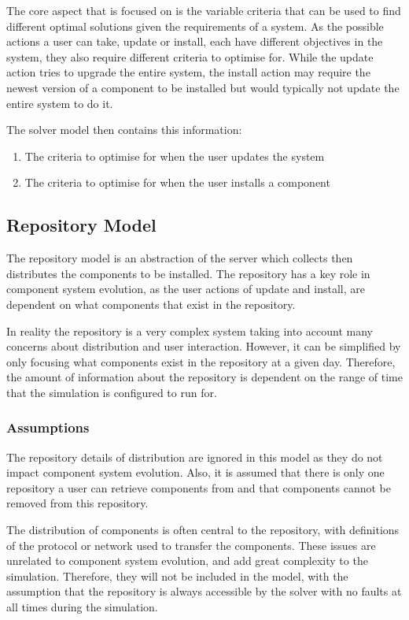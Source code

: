 The core aspect that is focused on is the variable criteria that can be used to find different optimal solutions given the requirements of a system.
As the possible actions a user can take, update or install, each have different objectives in the system,
they also require different criteria to optimise for.
While the update action tries to upgrade the entire system, 
the install action may require the newest version of a component to be installed but would typically not update the entire system to do it. 

The solver model then contains this information:
\begin{enumerate}
  \item The criteria to optimise for when the user updates the system
  \item The criteria to optimise for when the user installs a component
\end{enumerate}

\subsection{Repository Model}
The repository model is an abstraction of the server which collects then distributes the components to be installed.
The repository has a key role in component system evolution, 
as the user actions of update and install, are dependent on what components that exist in the repository.

In reality the repository is a very complex system taking into account many concerns about distribution and user interaction.
However, it can be simplified by only focusing what components exist in the repository at a given day. 
Therefore, the amount of information about the repository is dependent on the range of time that the simulation is configured to run for.

\subsubsection{Assumptions}
The repository details of distribution are ignored in this model as they do not impact component system evolution.
Also, it is assumed that there is only one repository a user can retrieve components from and that components cannot be removed from this repository.

The distribution of components is often central to the repository, 
with definitions of the protocol or network used to transfer the components.
These issues are unrelated to component system evolution, and add great complexity to the simulation.
Therefore, they will not be included in the model, with the assumption that the repository is always accessible by the solver with no faults at all times during the simulation.

